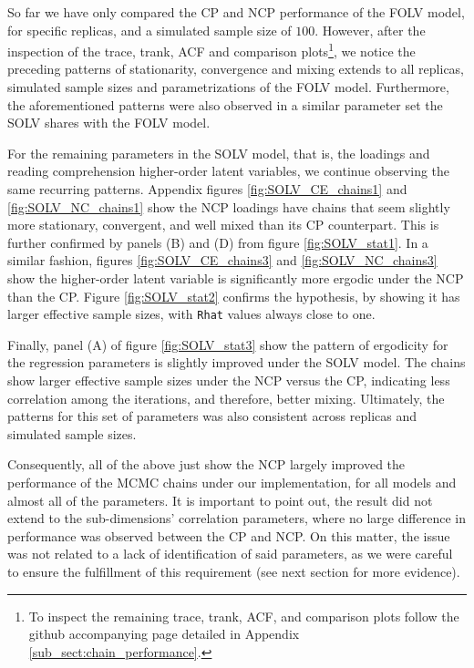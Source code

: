 So far we have only compared the CP and NCP performance of the FOLV model, for specific replicas, and a simulated sample size of $100$. However, after the inspection of the trace, trank, ACF and comparison plots\footnote{To inspect the remaining trace, trank, ACF, and comparison plots follow the github accompanying page detailed in Appendix \ref{sub_sect:chain_performance}.}, we notice the preceding patterns of stationarity, convergence and mixing extends to all replicas, simulated sample sizes and parametrizations of the FOLV model. Furthermore, the aforementioned patterns were also observed in a similar parameter set the SOLV shares with the FOLV model. 

For the remaining parameters in the SOLV model, that is, the loadings and reading comprehension higher-order latent variables, we continue observing the same recurring patterns. Appendix figures \ref{fig:SOLV_CE_chains1} and \ref{fig:SOLV_NC_chains1} show the NCP loadings have chains that seem slightly more stationary, convergent, and well mixed than its CP counterpart. This is further confirmed by panels (B) and (D) from figure \ref{fig:SOLV_stat1}. In a similar fashion, figures \ref{fig:SOLV_CE_chains3} and \ref{fig:SOLV_NC_chains3} show the higher-order latent variable is significantly more ergodic under the NCP than the CP. Figure \ref{fig:SOLV_stat2} confirms the hypothesis, by showing it has larger effective sample sizes, with \texttt{Rhat} values always close to one.

Finally, panel (A) of figure \ref{fig:SOLV_stat3} show the pattern of ergodicity for the regression parameters is slightly improved under the SOLV model. The chains show larger effective sample sizes under the NCP versus the CP, indicating less correlation among the iterations, and therefore, better mixing. Ultimately, the patterns for this set of parameters was also consistent across replicas and simulated sample sizes.

\begin{comment}
The result appear to be sensible because of two factors, (i) as not only the different sub-dimensions are , but also beacuse the SOLV model was the data generating model.
\end{comment}

Consequently, all of the above just show the NCP largely improved the performance of the MCMC chains under our implementation, for all models and almost all of the parameters. It is important to point out, the result did not extend to the sub-dimensions' correlation parameters, where no large difference in performance was observed between the CP and NCP. On this matter, the issue was not related to a lack of identification of said parameters, as we were careful to ensure the fulfillment of this requirement (see next section for more evidence).

